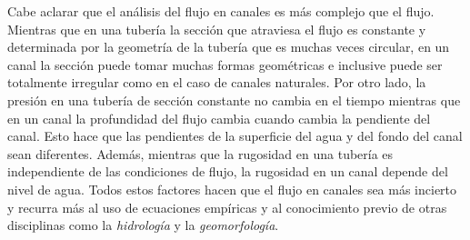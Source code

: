 \documentclass[11pt, oneside]{article}
\begin{document}
Cabe aclarar que el an\'alisis del flujo en canales es m\'as complejo que el flujo. Mientras que en una tuber\'ia la secci\'on que atraviesa el flujo es constante y determinada por la geometr\'ia de la tuber\'ia que es muchas veces circular, en un canal la secci\'on puede tomar muchas formas geom\'etricas e inclusive puede ser totalmente irregular como en el caso de canales naturales. Por otro lado, la presi\'on en una tuber\'ia de secci\'on constante no cambia en el tiempo mientras que en un canal la profundidad  del flujo cambia cuando cambia la pendiente del canal. Esto hace que las pendientes de la superficie del agua y del fondo del canal sean diferentes. Adem\'as, mientras que la rugosidad en una tuber\'ia es independiente de las condiciones de flujo, la rugosidad en un canal depende del nivel de agua. Todos estos factores hacen que el flujo en canales sea m\'as incierto y recurra m\'as al uso de ecuaciones emp\'iricas y al conocimiento previo de otras disciplinas como la \emph{hidrolog\'ia} y la \emph{geomorfolog\'ia}.
\end{document}
